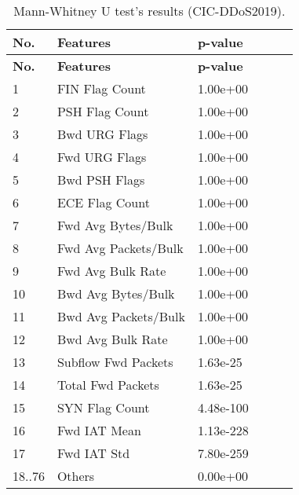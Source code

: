 \begin{center}
    \begin{longtable}{|l|l|l|l|l|l|}
        \caption{Mann-Whitney U test’s results (CIC-DDoS2019).} \\

        \hline
        \textbf{No.} & \textbf{Features} & \textbf{p-value} \\
        \hline
        \endfirsthead

        \hline
        \textbf{No.} & \textbf{Features} & \textbf{p-value} \\
        \hline
        \endhead

        1 & FIN Flag Count & 1.00e+00 \\
        \hline
        2 & PSH Flag Count & 1.00e+00 \\
        \hline
        3 & Bwd URG Flags & 1.00e+00 \\
        \hline
        4 & Fwd URG Flags & 1.00e+00 \\
        \hline
        5 & Bwd PSH Flags & 1.00e+00 \\
        \hline
        6 & ECE Flag Count & 1.00e+00 \\
        \hline
        7 & Fwd Avg Bytes/Bulk & 1.00e+00 \\
        \hline
        8 & Fwd Avg Packets/Bulk & 1.00e+00 \\
        \hline
        9 & Fwd Avg Bulk Rate & 1.00e+00 \\
        \hline
        10 & Bwd Avg Bytes/Bulk & 1.00e+00 \\
        \hline
        11 & Bwd Avg Packets/Bulk & 1.00e+00 \\
        \hline
        12 & Bwd Avg Bulk Rate & 1.00e+00 \\
        \hline
        13 & Subflow Fwd Packets & 1.63e-25 \\
        \hline
        14 & Total Fwd Packets & 1.63e-25 \\
        \hline
        15 & SYN Flag Count & 4.48e-100 \\
        \hline
        16 & Fwd IAT Mean & 1.13e-228 \\
        \hline
        17 & Fwd IAT Std & 7.80e-259 \\
        \hline
        18..76 & Others & 0.00e+00 \\
        \hline
    \end{longtable}
\end{center}
